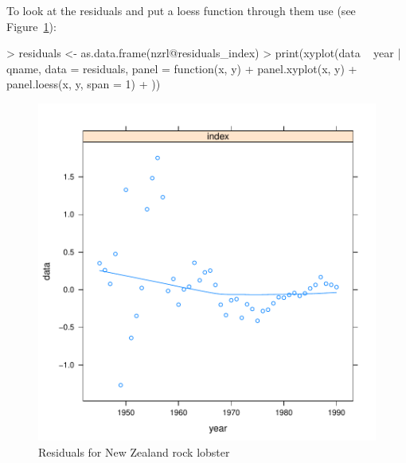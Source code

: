 \documentclass[a4paper]{article}
\begin{document}
To look at the residuals and put a loess function through them use (see Figure~\ref{fig:residuals_nzrl}):
\begin{center}
\begin{minipage}[H]{0.95\textwidth}%
\begin{shaded}%
\begin{Schunk}
\begin{Sinput}
> residuals <- as.data.frame(nzrl@residuals_index)
> print(xyplot(data ~ year | qname, data = residuals, panel = function(x, y) {
+     panel.xyplot(x, y)
+     panel.loess(x, y, span = 1)
+ }))
\end{Sinput}
\end{Schunk}
\end{shaded}%
\end{minipage}
\end{center}

\begin{figure}
\begin{center}
\includegraphics{flsp_man-nzrlresidplot}
\end{center}
\caption{Residuals for New Zealand rock lobster}
\label{fig:residuals_nzrl}
\end{figure}
\end{document}
